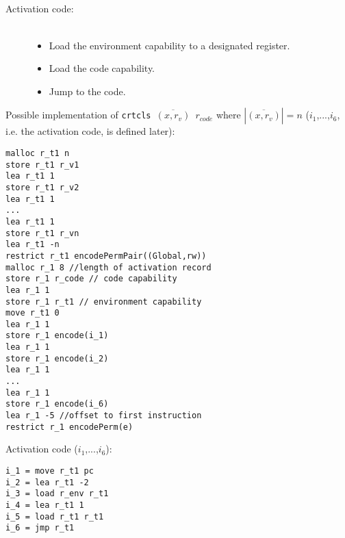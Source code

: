 \documentclass[a4paper]{article}
\newcommand{\forcenewline}{$\phantom{v}$\\}
\newcommand{\var}[1]{\mathit{#1}}
\begin{document}
\begin{description}
\begin{description}
  \item[Activation code:] \forcenewline
    \begin{itemize}
    \item Load the environment capability to a designated register.
    \item Load the code capability.
    \item Jump to the code.
    \end{itemize}
  \end{description}
Possible implementation of \texttt{crtcls $\overline{(x,r_v)}$ $r_{\var{code}}$} where $|\overline{(x,r_v)}| = n$ ($i_1$,...,$i_6$, i.e. the activation code, is defined later):
\begin{lstlisting}
malloc r_t1 n
store r_t1 r_v1
lea r_t1 1
store r_t1 r_v2
lea r_t1 1
...
lea r_t1 1
store r_t1 r_vn
lea r_t1 -n
restrict r_t1 encodePermPair((Global,rw))
malloc r_1 8 //length of activation record
store r_1 r_code // code capability
lea r_1 1
store r_1 r_t1 // environment capability
move r_t1 0
lea r_1 1
store r_1 encode(i_1)
lea r_1 1
store r_1 encode(i_2)
lea r_1 1
...
lea r_1 1
store r_1 encode(i_6)
lea r_1 -5 //offset to first instruction
restrict r_1 encodePerm(e)
\end{lstlisting}
Activation code ($i_1$,...,$i_6$):
\begin{lstlisting}
i_1 = move r_t1 pc
i_2 = lea r_t1 -2
i_3 = load r_env r_t1
i_4 = lea r_t1 1
i_5 = load r_t1 r_t1
i_6 = jmp r_t1
\end{lstlisting}


\end{description}
\end{document}
